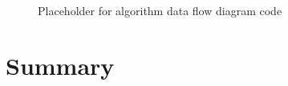 \begin{figure}[htbp!]
	\centering
	\setlength \fboxsep{0pt}
	\setlength \fboxrule{0.5pt}
	\caption{Placeholder for algorithm data flow diagram code}
	\label{fig:GAFlowDiagram}
\end{figure}
\section {Summary}
